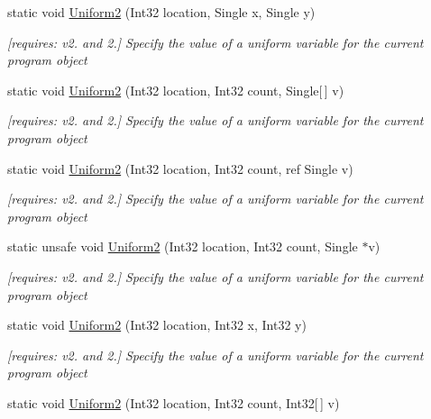 \begin{DoxyCompactItemize}
static void \hyperlink{class_open_t_k_1_1_graphics_1_1_e_s20_1_1_g_l_aa4996cca1cb42befa56368b17b30da9a}{Uniform2} (Int32 location, Single x, Single y)
\begin{DoxyCompactList}\small\item\em \mbox{[}requires\-: v2. and 2.\mbox{]} Specify the value of a uniform variable for the current program object \end{DoxyCompactList}\item 
static void \hyperlink{class_open_t_k_1_1_graphics_1_1_e_s20_1_1_g_l_a3e468ce6f2869872bdedda1ebf142058}{Uniform2} (Int32 location, Int32 count, Single\mbox{[}$\,$\mbox{]} v)
\begin{DoxyCompactList}\small\item\em \mbox{[}requires\-: v2. and 2.\mbox{]} Specify the value of a uniform variable for the current program object \end{DoxyCompactList}\item 
static void \hyperlink{class_open_t_k_1_1_graphics_1_1_e_s20_1_1_g_l_adf611491ba9f397a75062eb4f272b81e}{Uniform2} (Int32 location, Int32 count, ref Single v)
\begin{DoxyCompactList}\small\item\em \mbox{[}requires\-: v2. and 2.\mbox{]} Specify the value of a uniform variable for the current program object \end{DoxyCompactList}\item 
static unsafe void \hyperlink{class_open_t_k_1_1_graphics_1_1_e_s20_1_1_g_l_aeb831dfbd4fd717ef8487990687a3673}{Uniform2} (Int32 location, Int32 count, Single $\ast$v)
\begin{DoxyCompactList}\small\item\em \mbox{[}requires\-: v2. and 2.\mbox{]} Specify the value of a uniform variable for the current program object \end{DoxyCompactList}\item 
static void \hyperlink{class_open_t_k_1_1_graphics_1_1_e_s20_1_1_g_l_a0fe58a48200e9f0ba2f9819d68f2511c}{Uniform2} (Int32 location, Int32 x, Int32 y)
\begin{DoxyCompactList}\small\item\em \mbox{[}requires\-: v2. and 2.\mbox{]} Specify the value of a uniform variable for the current program object \end{DoxyCompactList}\item 
static void \hyperlink{class_open_t_k_1_1_graphics_1_1_e_s20_1_1_g_l_adfb72cb52ad2da65428962c903a40738}{Uniform2} (Int32 location, Int32 count, Int32\mbox{[}$\,$\mbox{]} v)

\end{DoxyCompactItemize}
